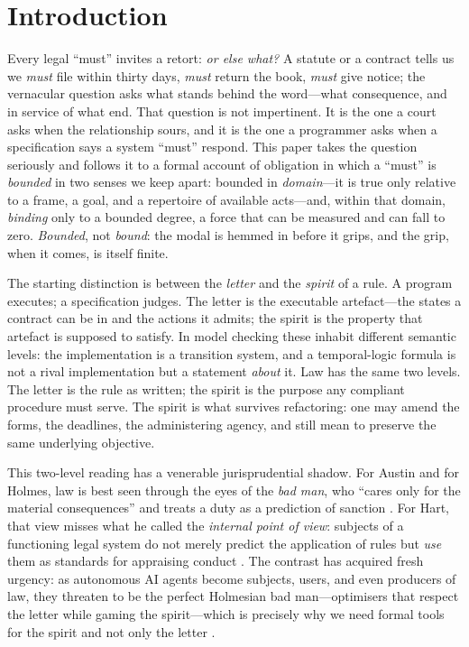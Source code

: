 
\section{Introduction}
\label{sec:intro}

Every legal ``must'' invites a retort: \emph{or else what?} A statute or a contract
tells us we \emph{must} file within thirty days, \emph{must} return the book, \emph{must}
give notice; the vernacular question asks what stands behind the word---what consequence,
and in service of what end. That question is not impertinent. It is the one a court asks
when the relationship sours, and it is the one a programmer asks when a specification says
a system ``must'' respond. This paper takes the question seriously and follows it to a
formal account of obligation in which a ``must'' is \emph{bounded} in two senses we keep
apart: bounded in \emph{domain}---it is true only relative to a frame, a goal, and a
repertoire of available acts---and, within that domain, \emph{binding} only to a bounded
degree, a force that can be measured and can fall to zero. \emph{Bounded}, not \emph{bound}:
the modal is hemmed in before it grips, and the grip, when it comes, is itself finite.

The starting distinction is between the \emph{letter} and the \emph{spirit} of a rule. A
program executes; a specification judges. The letter is the executable artefact---the
states a contract can be in and the actions it admits; the spirit is the property that
artefact is supposed to satisfy. In model checking these inhabit different semantic
levels: the implementation is a transition system, and a temporal-logic formula is not a
rival implementation but a statement \emph{about} it. Law has the same two levels. The
letter is the rule as written; the spirit is the purpose any compliant procedure must
serve. The spirit is what survives refactoring: one may amend the forms, the deadlines,
the administering agency, and still mean to preserve the same underlying objective.

This two-level reading has a venerable jurisprudential shadow. For Austin and for Holmes,
law is best seen through the eyes of the \emph{bad man}, who ``cares only for the material
consequences'' and treats a duty as a prediction of sanction . For Hart,
that view misses what he called the \emph{internal point of view}: subjects of a
functioning legal system do not merely predict the application of rules but \emph{use}
them as standards for appraising conduct . The contrast has acquired fresh
urgency: as autonomous AI agents become subjects, users, and even producers of law, they
threaten to be the perfect Holmesian bad man---optimisers that respect the letter while
gaming the spirit---which is precisely why we need formal tools for the spirit and not
only the letter .

